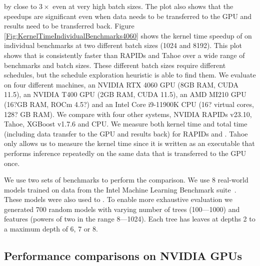 by close to $3\times$ even at very high batch sizes. The plot also shows that the speedups are significant 
even when data needs to be transferred to the GPU and results need to be transferred back.
Figure \ref{Fig:KernelTimeIndividualBenchmarks4060} shows the kernel time speedup 
of \Treebeard{} on individual benchmarks at two different batch sizes (1024 and 8192). This plot 
shows that \Treebeard{} is consistently faster than RAPIDs and Tahoe over a wide range of benchmarks
and batch sizes. These different batch sizes require different schedules, but the \Treebeard{} 
schedule exploration heuristic is able to find them.
We evaluate \Treebeard{} on four different machines, an NVIDIA RTX 4060 GPU (8GB RAM, CUDA 11.5), an NVIDIA T400 GPU (2GB RAM, CUDA 11.5), an AMD MI210 GPU (16?GB RAM, ROCm 4.5?) and an Intel Core i9-11900K CPU (16? virtual cores, 128? GB RAM). We compare \Treebeard{} with four other systems, NVIDIA RAPIDs v23.10, Tahoe, XGBoost v1.7.6 and \TreebeardOLD{} CPU. We measure both kernel time and total time (including data transfer to the GPU and results back) for RAPIDs and \Treebeard{}. Tahoe only allows us to measure the kernel time since it is written as an executable that performs inference repeatedly on the same data that is transferred to the GPU once.

We use two sets of benchmarks to perform the comparison.
We use 8 real-world models trained on data from the Intel Machine Learning Benchmark suite~\cite{}. These models were also used to \TreebeardOLD{}\cite{Treebeard}.
To enable more exhaustive evaluation we generated 700 random models with varying number of trees (100---1000) and features (powers of two in the range 8---1024). Each tree has leaves at depths 2 to a maximum depth of 6, 7 or 8. 
\subsection{Performance comparisons on NVIDIA GPUs}
